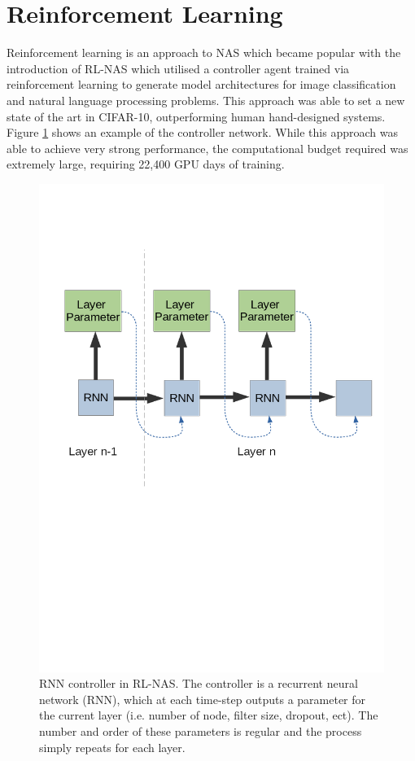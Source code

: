 \documentclass{article}
\begin{document}
\section{Reinforcement Learning}

	Reinforcement learning is an approach to NAS which became popular with the introduction of RL-NAS \cite{NAS-RL} which utilised a controller agent trained via reinforcement learning to generate model architectures for image classification and natural language processing problems. This approach was able to set a new state of the art in CIFAR-10, outperforming human hand-designed systems. Figure \ref{fig:RL} shows an example of the controller network. While this approach was able to achieve very strong performance, the computational budget required was extremely large, requiring 22,400 GPU days of training. 
 
	\begin{figure}[h]

			\includegraphics[trim=0 320 0 150 ,scale=0.3]{NAS-RL.png}
			\centering
			\caption{RNN controller in RL-NAS. The controller is a recurrent neural network (RNN), which at each time-step outputs a parameter for the current layer (i.e. number of node, filter size, dropout, ect). The number and order of these parameters is regular and the process simply repeats for each layer.   
			}
			\label{fig:RL}

	\end{figure}
\end{document}
